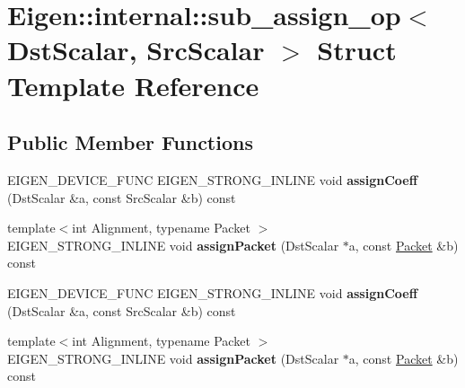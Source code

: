 \hypertarget{struct_eigen_1_1internal_1_1sub__assign__op}{}\section{Eigen\+:\+:internal\+:\+:sub\+\_\+assign\+\_\+op$<$ Dst\+Scalar, Src\+Scalar $>$ Struct Template Reference}
\label{struct_eigen_1_1internal_1_1sub__assign__op}
\subsection*{Public Member Functions}
\begin{DoxyCompactItemize}
\item 
\mbox{\label{struct_eigen_1_1internal_1_1sub__assign__op_a9701deedd06e9fd962d46c281497dc6a}} 
E\+I\+G\+E\+N\+\_\+\+D\+E\+V\+I\+C\+E\+\_\+\+F\+U\+NC E\+I\+G\+E\+N\+\_\+\+S\+T\+R\+O\+N\+G\+\_\+\+I\+N\+L\+I\+NE void {\bfseries assign\+Coeff} (Dst\+Scalar \&a, const Src\+Scalar \&b) const
\item 
\mbox{\label{struct_eigen_1_1internal_1_1sub__assign__op_a588c53828a0546c9b34f69bcb5706b61}} 
{\footnotesize template$<$int Alignment, typename Packet $>$ }\\E\+I\+G\+E\+N\+\_\+\+S\+T\+R\+O\+N\+G\+\_\+\+I\+N\+L\+I\+NE void {\bfseries assign\+Packet} (Dst\+Scalar $\ast$a, const \hyperlink{union_eigen_1_1internal_1_1_packet}{Packet} \&b) const
\item 
\mbox{\label{struct_eigen_1_1internal_1_1sub__assign__op_a9701deedd06e9fd962d46c281497dc6a}} 
E\+I\+G\+E\+N\+\_\+\+D\+E\+V\+I\+C\+E\+\_\+\+F\+U\+NC E\+I\+G\+E\+N\+\_\+\+S\+T\+R\+O\+N\+G\+\_\+\+I\+N\+L\+I\+NE void {\bfseries assign\+Coeff} (Dst\+Scalar \&a, const Src\+Scalar \&b) const
\item 
\mbox{\label{struct_eigen_1_1internal_1_1sub__assign__op_a588c53828a0546c9b34f69bcb5706b61}} 
{\footnotesize template$<$int Alignment, typename Packet $>$ }\\E\+I\+G\+E\+N\+\_\+\+S\+T\+R\+O\+N\+G\+\_\+\+I\+N\+L\+I\+NE void {\bfseries assign\+Packet} (Dst\+Scalar $\ast$a, const \hyperlink{union_eigen_1_1internal_1_1_packet}{Packet} \&b) const
\end{DoxyCompactItemize}


